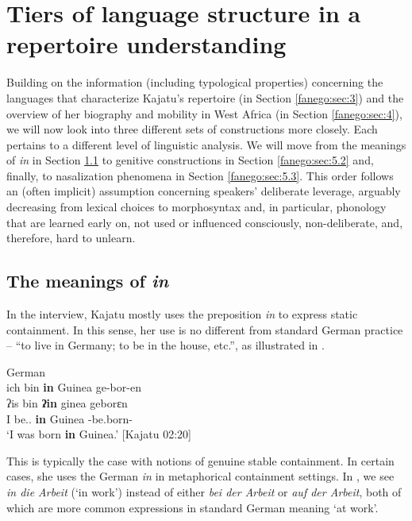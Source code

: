 \documentclass[output=paper]{langscibook}
\begin{document}
\section{Tiers of language structure in a repertoire understanding}\label{fanego:sec:5}
Building on the information (including typological properties) concerning the languages that characterize Kajatu’s repertoire (in Section \ref{fanego:sec:3}) and the overview of her biography and mobility in West Africa (in Section \ref{fanego:sec:4}), we will now look into three different sets of constructions more closely. Each pertains to a different level of linguistic analysis. We will move from the meanings of \textit{in} in Section \ref{fanego:sec:5.1} to genitive constructions in Section \ref{fanego:sec:5.2} and, finally, to nasalization phenomena in Section \ref{fanego:sec:5.3}. This order follows an (often implicit) assumption concerning speakers’ deliberate leverage, arguably decreasing from lexical choices to morphosyntax and, in particular, phonology that are learned early on, not used or influenced consciously, non-deliberate, and, therefore, hard to unlearn.

\subsection{The meanings of \textit{in}}\label{fanego:sec:5.1}
In the interview, Kajatu mostly uses the preposition \textit{in} to express static containment. In this sense, her use is no different from standard German practice – “to live in Germany; to be in the house, etc.”, as illustrated in .

\begin{exe}
    \ex\label{fanego:ex:3} German \\
    \glll ich bin \textbf{in} Guinea {ge-bor-en} \\
    ʔis bin \textbf{ʔin} ginea geborɛn \\
    I be.\First\SG.\PRS{} \textbf{in} Guinea \PTCP-be.born-\PTCP{} \\
    \glt ‘I was born \textbf{in} Guinea.’ [Kajatu 02:20]
\end{exe}

\noindent
This is typically the case with notions of genuine stable containment. In certain cases, she uses the German \textit{in} in metaphorical containment settings. In , we see \textit{in die Arbeit} (‘in work’) instead of either \textit{bei der Arbeit} or \textit{auf der Arbeit}, both of which are more common expressions in standard German meaning ‘at work’.
\end{document}
